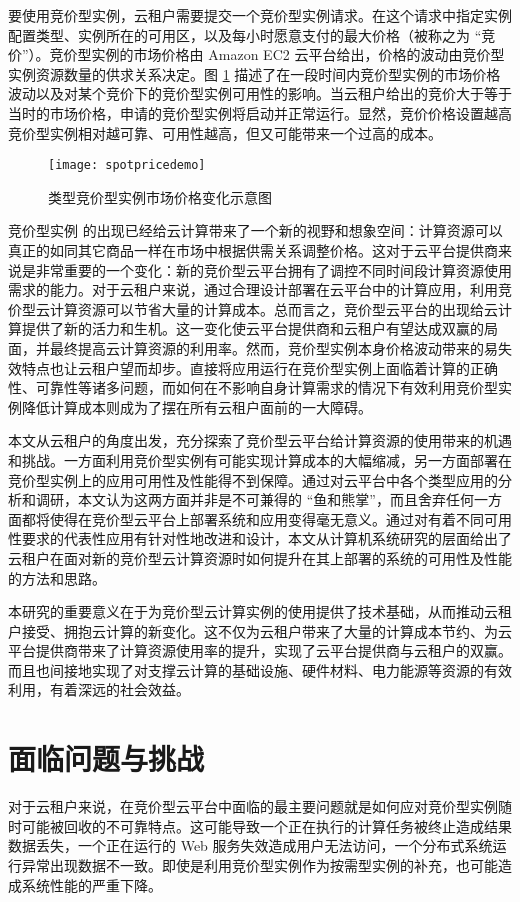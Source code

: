要使用竞价型实例，云租户需要提交一个竞价型实例请求。在这个请求中指定实例配置类型、实例所在的可用区，以及每小时愿意支付的最大价格（被称之为 ``竞价''）。竞价型实例的市场价格由 Amazon EC2 云平台给出，价格的波动由竞价型实例资源数量的供求关系决定。图 \ref{figure:spdemo} 描述了在一段时间内竞价型实例的市场价格波动以及对某个竞价下的竞价型实例可用性的影响。当云租户给出的竞价大于等于当时的市场价格，申请的竞价型实例将启动并正常运行。显然，竞价价格设置越高竞价型实例相对越可靠、可用性越高，但又可能带来一个过高的成本。
\begin{figure}
  \centering
  \texttt{[image: spotpricedemo]}
  \caption{类型竞价型实例市场价格变化示意图}
  \label{figure:spdemo}
\end{figure}

竞价型实例 \cite{SI:2014} 的出现已经给云计算带来了一个新的视野和想象空间：计算资源可以真正的如同其它商品一样在市场中根据供需关系调整价格。这对于云平台提供商来说是非常重要的一个变化：新的竞价型云平台拥有了调控不同时间段计算资源使用需求的能力。对于云租户来说，通过合理设计部署在云平台中的计算应用，利用竞价型云计算资源可以节省大量的计算成本。总而言之，竞价型云平台的出现给云计算提供了新的活力和生机。这一变化使云平台提供商和云租户有望达成双赢的局面，并最终提高云计算资源的利用率。然而，竞价型实例本身价格波动带来的易失效特点也让云租户望而却步。直接将应用运行在竞价型实例上面临着计算的正确性、可靠性等诸多问题，而如何在不影响自身计算需求的情况下有效利用竞价型实例降低计算成本则成为了摆在所有云租户面前的一大障碍。

本文从云租户的角度出发，充分探索了竞价型云平台给计算资源的使用带来的机遇和挑战。一方面利用竞价型实例有可能实现计算成本的大幅缩减，另一方面部署在竞价型实例上的应用可用性及性能得不到保障。通过对云平台中各个类型应用的分析和调研，本文认为这两方面并非是不可兼得的 ``鱼和熊掌''，而且舍弃任何一方面都将使得在竞价型云平台上部署系统和应用变得毫无意义。通过对有着不同可用性要求的代表性应用有针对性地改进和设计，本文从计算机系统研究的层面给出了云租户在面对新的竞价型云计算资源时如何提升在其上部署的系统的可用性及性能的方法和思路。

本研究的重要意义在于为竞价型云计算实例的使用提供了技术基础，从而推动云租户接受、拥抱云计算的新变化。这不仅为云租户带来了大量的计算成本节约、为云平台提供商带来了计算资源使用率的提升，实现了云平台提供商与云租户的双赢。而且也间接地实现了对支撑云计算的基础设施、硬件材料、电力能源等资源的有效利用，有着深远的社会效益。

\section{面临问题与挑战}
对于云租户来说，在竞价型云平台中面临的最主要问题就是如何应对竞价型实例随时可能被回收的不可靠特点。这可能导致一个正在执行的计算任务被终止造成结果数据丢失，一个正在运行的 Web 服务失效造成用户无法访问，一个分布式系统运行异常出现数据不一致。即使是利用竞价型实例作为按需型实例的补充，也可能造成系统性能的严重下降。


